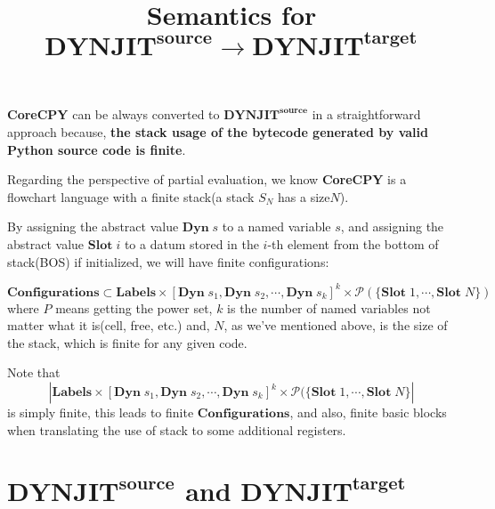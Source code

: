 \documentclass[12pt, a4paper]{report}
\title{Semantics for $\mathbf{DYNJIT}^\mathbf{source} \rightarrow \mathbf{DYNJIT}^\mathbf{target}$}
\begin{document}
\maketitle

\textbf{CoreCPY} can be always converted to $\mathbf{DYNJIT}^\mathbf{source}$
in a straightforward approach because,
\textbf{the stack usage of the bytecode generated by valid Python source code is finite}.

Regarding the perspective of partial evaluation,
we know \textbf{CoreCPY} is a flowchart language with a finite stack(a stack $S_N$ has a size$N$).

By assigning the abstract value $\mathbf{Dyn}\; s$ to a named variable $s$,
and assigning the abstract value $\mathbf{Slot}\; i$ to a datum stored in the $i$-th element from the bottom of stack(BOS) if initialized,
we will have finite configurations:

$$ \mathbf{Configurations} \subset \mathbf{Labels} \times 
\left[\mathbf{Dyn}\; s_1, \mathbf{Dyn}\; s_2, \cdots, \mathbf{Dyn}\; s_k \right]^k
\times \mathcal {P}(\{\mathbf{Slot}\; 1, \cdots, \mathbf {Slot}\; N \})
$$
where 
$P$ means getting the power set, $k$ is the number of named variables not matter what it is(cell, free, etc.) and,
$N$, as we've mentioned above, is the size of the stack, which is finite for any given code.

Note that
$$ \left| \mathbf{Labels} \times 
\left[\mathbf{Dyn}\; s_1, \mathbf{Dyn}\; s_2, \cdots, \mathbf{Dyn}\; s_k \right]^k
\times \mathcal {P}(\{\mathbf{Slot}\; 1, \cdots, \mathbf {Slot}\; N \} \right| $$ is simply finite,
this leads to finite $\mathbf{Configurations}$, and also, finite basic blocks
when translating the use of stack to some additional registers.

\newpage

\section*{
    $\mathbf{DYNJIT}^{\mathbf{source}}$ 
    and 
    $\mathbf{DYNJIT}^{\mathbf{target}}$
}
\end{document}
